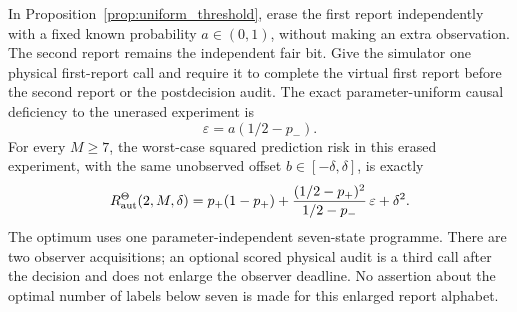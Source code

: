 \begin{corollary}\label{cor:uniform_erasure}
In Proposition~\ref{prop:uniform_threshold}, erase the first report independently with a fixed known probability $a\in(0,1)$, without making an extra observation. The second report remains the independent fair bit. Give the simulator one physical first-report call and require it to complete the virtual first report before the second report or the postdecision audit. The exact parameter-uniform causal deficiency to the unerased experiment is
\begin{equation}\label{eq:uniform_exact_deficiency}
 \varepsilon=a(1/2-p_-).
\end{equation}
For every $M\ge7$, the worst-case squared prediction risk in this erased experiment, with the same unobserved offset $b\in[-\delta,\delta]$, is exactly
\begin{equation}\label{eq:uniform_all_coordinates}
 R^{\Theta}_{\mathrm{aut}}(2,M,\delta)
 =p_+(1-p_+)
  +\frac{(1/2-p_+)^2}{1/2-p_-}\,\varepsilon+\delta^2.
\end{equation}
The optimum uses one parameter-independent seven-state programme. There are two observer acquisitions; an optional scored physical audit is a third call after the decision and does not enlarge the observer deadline. No assertion about the optimal number of labels below seven is made for this enlarged report alphabet.
\end{corollary}

